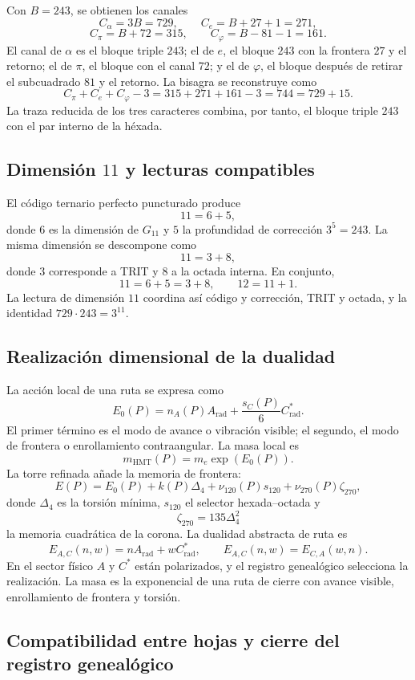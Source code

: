 Con \(B=243\), se obtienen los canales
\[
C_\alpha=3B=729,
\qquad
C_e=B+27+1=271,
\]
\[
C_\pi=B+72=315,
\qquad
C_\varphi=B-81-1=161.
\]
El canal de \(\alpha\) es el bloque triple \(243\); el de \(e\), el bloque
\(243\) con la frontera \(27\) y el retorno; el de \(\pi\), el bloque con el
canal \(72\); y el de \(\varphi\), el bloque después de retirar el
subcuadrado \(81\) y el retorno.
La bisagra se reconstruye como
\[
C_\pi+C_e+C_\varphi-3
=315+271+161-3
=744
=729+15.
\]
La traza reducida de los tres caracteres combina, por tanto, el bloque triple
\(243\) con el par interno de la héxada.

\subsection{Dimensión \texorpdfstring{\(11\)}{11} y lecturas compatibles}

El código ternario perfecto puncturado produce
\[
11=6+5,
\]
donde \(6\) es la dimensión de \(G_{11}\) y \(5\) la profundidad de
corrección \(3^5=243\). La misma dimensión se descompone como
\[
11=3+8,
\]
donde \(3\) corresponde a TRIT y \(8\) a la octada interna. En conjunto,
\[
11=6+5=3+8,
\qquad
12=11+1.
\]
La lectura de dimensión \(11\) coordina así código y corrección, TRIT y
octada, y la identidad \(729\cdot243=3^{11}\).

\subsection{Realización dimensional de la dualidad}

La acción local de una ruta se expresa como
\[
E_0(P)=n_A(P)A_{\mathrm{rad}}
+\frac{s_C(P)}{6}C^*_{\mathrm{rad}}.
\]
El primer término es el modo de avance o vibración visible; el segundo, el
modo de frontera o enrollamiento contraangular. La masa local es
\[
m_{\mathrm{HMT}}(P)=m_e\exp(E_0(P)).
\]
La torre refinada añade la memoria de frontera:
\[
E(P)=E_0(P)+k(P)\Delta_4
+\nu_{120}(P)s_{120}
+\nu_{270}(P)\zeta_{270},
\]
donde \(\Delta_4\) es la torsión mínima, \(s_{120}\) el selector
hexada--octada y
\[
\zeta_{270}=135\Delta_4^2
\]
la memoria cuadrática de la corona. La dualidad abstracta de ruta es
\[
E_{A,C}(n,w)=nA_{\mathrm{rad}}+wC^*_{\mathrm{rad}},
\qquad
E_{A,C}(n,w)=E_{C,A}(w,n).
\]
En el sector físico \(A\) y \(C^*\) están polarizados, y el registro genealógico selecciona
la realización. La masa es la exponencial de una ruta de cierre con avance
visible, enrollamiento de frontera y torsión.

\subsection{Compatibilidad entre hojas y cierre del registro genealógico}

